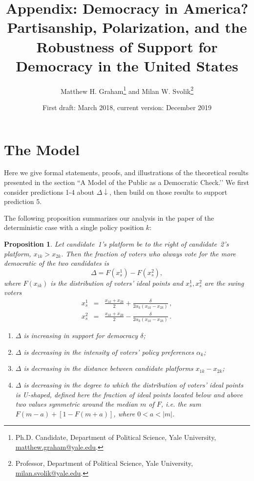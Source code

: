 \documentclass[12pt]{article}
\title{\vspace*{2em} Appendix: Democracy in America? \\ Partisanship, Polarization, and the Robustness of Support for Democracy in the United States}
\author{Matthew H. Graham\thanks{Ph.D. Candidate, Department of Political Science, Yale University, \href{email:matthew.graham@yale.edu}{matthew.graham@yale.edu}.} \hspace{1mm} and Milan W. Svolik\thanks{Professor, Department of Political Science, Yale University, \href{email:milan.svolik@yale.edu}{milan.svolik@yale.edu}.}}
\date{First draft: March 2018, current version: December 2019}
\newtheorem{proposition}{Proposition}
\begin{document}
\maketitle

\newpage

\tableofcontents

\normalsize

\newpage
\appendix
\onehalfspacing


\section{The Model}


Here we give formal statements, proofs, and illustrations of the theoretical results presented in the section ``A Model of the Public as a Democratic Check.’’ We first consider predictions 1-4 about $\Delta \downarrow$, then build on those results to support prediction 5.

The following proposition summarizes our analysis in the paper of the deterministic case with a single policy position $k$:
\begin{proposition} \label{prop: case1}
Let candidate~1's platform be to the right of candidate~2's platform, $x_{1k} > x_{2k}$. Then the fraction of voters who always vote for the more democratic of the two candidates is
\begin{equation*}
\Delta = F(x_{s}^1)- F(x_{s}^2),
\end{equation*}
where $F(x_{ik})$ is the distribution of voters' ideal points and $x_{s}^1, x_{s}^2$ are the swing voters
\begin{eqnarray*}
x_{s}^1 &=& \frac{x_{1k} + x_{2k}}{2} + \frac{\delta}{2 \alpha_k (x_{1k} - x_{2k})} \, , \\
x_{s}^2 &=& \frac{x_{1k} + x_{2k}}{2} - \frac{\delta}{2 \alpha_k (x_{1k} - x_{2k})} \, .
\end{eqnarray*}
\renewcommand{\labelenumi}{(\roman{enumi})}
\begin{enumerate}
\item $\Delta$ is increasing in support for democracy $\delta$;
\item $\Delta$ is decreasing in the intensity of voters' policy preferences $\alpha_k$;
\item $\Delta$ is decreasing in the distance between candidate platforms $x_{1k} - x_{2k}$;
\item $\Delta$ is decreasing in the degree to which the distribution of voters' ideal points is U-shaped, defined here the fraction of ideal points located below and above two values symmetric around the median $m$ of $F$, i.e. the sum $F(m-a) + [1-F(m+a)]$, where $0<a<|m|$.
\end{enumerate}
\end{proposition}
\end{document}
